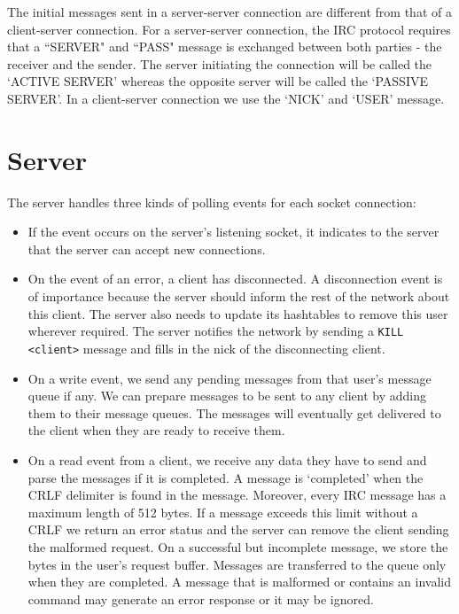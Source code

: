 \documentclass[letterpaper,twocolumn,10pt]{article}
\begin{document}
The initial messages sent in a server-server connection are different from that of a
client-server connection. For a server-server connection, the IRC protocol
requires that a ``SERVER" and ``PASS" message is exchanged between both parties -
the receiver and the sender. The server initiating the connection will be
called the `ACTIVE SERVER' whereas the opposite server will be called the
`PASSIVE SERVER'. In a client-server connection we use the `NICK' and `USER' message.


\section{Server}

The server handles three kinds of polling events for each socket connection:

\begin{itemize}
	\item If the event occurs on the server's listening socket, it indicates
	      to the server that the
	      server can accept new connections.
	\item On the event of an error, a client has disconnected. A disconnection event
	      is of importance because the server should inform the rest of the network
	      about this client. The server also needs to update its hashtables to remove this
	      user wherever required. The server notifies the network by sending a
	      \verb|KILL <client>| message and fills in the nick of the disconnecting client.
	\item On a write event, we send any pending messages from that user's
	      message queue
	      if any. We can prepare messages to be sent to any client by adding them
	      to
	      their message queues. The messages will eventually get delivered to the
	      client
	      when they are ready to receive them.
	\item On a read event from a client, we receive any data they have to send
	      and parse the messages if it is completed. A message is `completed'
	      when the CRLF delimiter is found in the message. Moreover, every IRC
	      message has a maximum length of 512 bytes. If a message exceeds this
	      limit without a CRLF we return an error status and the server can
	      remove the client sending the malformed request. On a successful but
	      incomplete message, we store the bytes in the user's request buffer.
	      Messages are transferred to the queue only when they are completed. A
	      message that is malformed or contains an invalid command may generate
	      an error response or it may be ignored.
\end{itemize}
\end{document}
